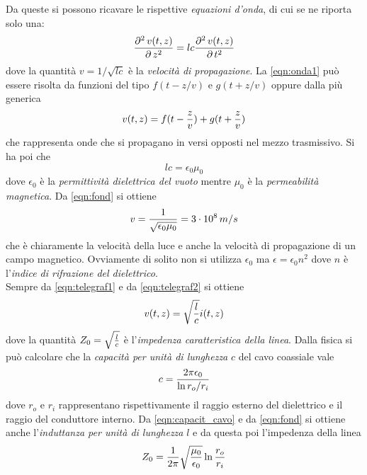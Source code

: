 \documentclass[a4paper,portrait,12pt]{article}
\theoremstyle{definition}
\begin{document}
Da queste si possono ricavare le rispettive \textit{equazioni d'onda}, di cui se ne riporta solo una:
\begin{equation}
\label{eqn:onda1}
{\partial^2\,v(t,z) \over \partial\,z^2} = lc {\partial^2\,v(t,z) \over \partial\,t^2}
\end{equation}
dove la quantità $v = 1/\sqrt{lc}$ è la \textit{velocità di propagazione}. La \ref{eqn:onda1} può essere
risolta da funzioni del tipo $f(t-z/v)$ e $g(t+z/v)$ oppure dalla più generica
\begin{equation}
\label{eqn:ondasol}
v(t,z) = f(t - {z\over v}) + g(t + {z\over v})
\end{equation}
che rappresenta onde che si propagano in versi opposti nel mezzo trasmissivo. Si ha poi che 
\begin{equation}
\label{eqn:fond}
lc = \epsilon_0 \mu_0
\end{equation}
dove $\epsilon_0$ è la \textit{permittività dielettrica del vuoto} mentre $\mu_0$ è la \textit{permeabilità
magnetica}. Da \ref{eqn:fond} si ottiene
\begin{equation}
\label{eqn:vluce}
v = {1 \over \sqrt{\epsilon_0 \mu_0}} = 3 \cdot 10^8\,m/s
\end{equation}
che è chiaramente la velocità della luce e anche la velocità di propagazione di un campo magnetico. 
Ovviamente di solito non si utilizza $\epsilon_0$ ma $\epsilon = \epsilon_0 n^2$ dove $n$ è l'\textit{indice
di rifrazione del dielettrico}.\\

Sempre da \ref{eqn:telegraf1} e da \ref{eqn:telegraf2} si ottiene
\begin{equation}
\label{eqn:impedenza}
v(t,z) = \sqrt{l \over c} i(t,z)
\end{equation}
dove la quantità $Z_0 = \sqrt{l \over c}$ è l'\textit{impedenza caratteristica della linea}. Dalla fisica
si può calcolare che la \textit{capacità per unità di lunghezza} $c$ del cavo coassiale vale 
\begin{equation}
\label{eqn:capacit_cavo}
c = {2\pi\epsilon_0 \over \ln{r_o / r_i}}
\end{equation}
dove $r_o$ e $r_i$ rappresentano rispettivamente il raggio esterno del dielettrico e il raggio del conduttore
interno. Da \ref{eqn:capacit_cavo} e da \ref{eqn:fond} si ottiene anche l'\textit{induttanza per unità di 
lunghezza} $l$ e da questa poi l'impedenza della linea
\begin{equation}
\label{eqn:impedenza}
Z_0 = {1 \over 2\pi} \sqrt{\mu_0 \over \epsilon_0} \ln{{r_o \over r_i}}
\end{equation}
\end{document}
